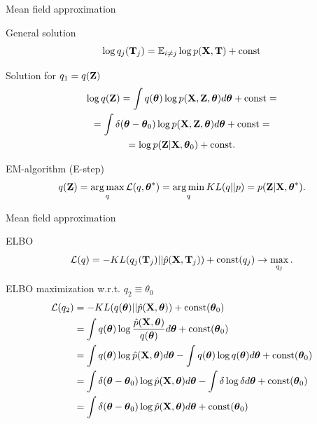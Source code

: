 \begin{frame}{Mean field approximation}
	\begin{block}{General solution}
		\vspace{-0.3cm}
		\[
		\log q_j(\mathbf{T}_j) = \mathbb{E}_{i \neq j} \log p(\mathbf{X}, \mathbf{T}) + \text{const}
		\]
		\vspace{-0.3cm}
	\end{block}
	\begin{block}{Solution for $q_1 = q(\mathbf{Z})$}
		\vspace{-0.3cm}
		\begin{multline*}
			\log q(\mathbf{Z}) = \int q(\boldsymbol{\theta}) \log p(\mathbf{X}, \mathbf{Z},  \boldsymbol{\theta}) d\boldsymbol{\theta} + \text{const} = \\
			= \int \delta(\boldsymbol{\theta} - \boldsymbol{\theta}_0) \log p(\mathbf{X}, \mathbf{Z},  \boldsymbol{\theta}) d\boldsymbol{\theta} + \text{const} = \\
			= \log p (\mathbf{Z} | \mathbf{X}, \boldsymbol{\theta}_0) +  \text{const}.
		\end{multline*}
	\end{block}
	\vspace{-0.3cm}
	\begin{block}{EM-algorithm (E-step)}
		\vspace{-0.3cm}
	\[
		q(\mathbf{Z}) = \operatorname*{arg\,max}_q \mathcal{L} (q, \boldsymbol{\theta}^*) = \operatorname*{arg\,min}_q KL(q || p) = p(\mathbf{Z}| \mathbf{X}, \boldsymbol{\theta}^*).
	\]
	\end{block}
\end{frame}
\begin{frame}{Mean field approximation}
	\begin{block}{ELBO}
		\[
			\mathcal{L} (q) = - KL (q_j(\mathbf{T}_j) || \hat{p}(\mathbf{X}, \mathbf{T}_j))  + \text{const}(q_j) \rightarrow \max_{q_j}.
		\]
	\vspace{-0.3cm}
	\end{block}
	\begin{block}{ELBO maximization w.r.t. $q_2 \equiv \theta_0$}
		\vspace{-0.3cm}
		\begin{align*}
			\mathcal{L} (q_2) &= - KL (q(\boldsymbol{\theta}) || \hat{p}(\mathbf{X}, \boldsymbol{\theta}))  + \text{const}(\boldsymbol{\theta}_0) \\ 
			&= \int q (\boldsymbol{\theta}) \log \frac{\hat{p}(\mathbf{X}, \boldsymbol{\theta})}{q(\boldsymbol{\theta})} d\boldsymbol{\theta} + \text{const}(\boldsymbol{\theta}_0) \\
			& = \int q (\boldsymbol{\theta}) \log \hat{p}(\mathbf{X}, \boldsymbol{\theta}) d\boldsymbol{\theta}  - \int q (\boldsymbol{\theta}) \log q(\boldsymbol{\theta}) d\boldsymbol{\theta} + \text{const}(\boldsymbol{\theta}_0) \\
			& = \int \delta(\boldsymbol{\theta} - \boldsymbol{\theta}_0) \log \hat{p}(\mathbf{X}, \boldsymbol{\theta}) d\boldsymbol{\theta}  - \int \delta \log \delta d\boldsymbol{\theta} + \text{const}(\boldsymbol{\theta}_0) \\ 
			& = \int \delta(\boldsymbol{\theta} - \boldsymbol{\theta}_0) \log \hat{p}(\mathbf{X}, \boldsymbol{\theta}) d\boldsymbol{\theta} + \text{const}(\boldsymbol{\theta}_0) 
		\end{align*}
		\vspace{-0.3cm}
	\end{block}
\end{frame}
